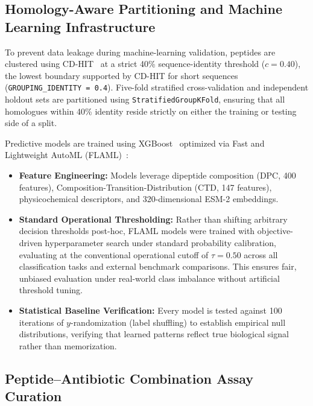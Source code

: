 \documentclass[unnumsec,webpdf,contemporary,large]{oup-authoring-template}%
\begin{document}
\subsection{Homology-Aware Partitioning and Machine Learning Infrastructure}

To prevent data leakage during machine-learning validation, peptides are clustered using CD-HIT~\cite{fu2012cdhit} at a strict 40\% sequence-identity threshold ($c = 0.40$), the lowest boundary supported by CD-HIT for short sequences (\texttt{GROUPING\_IDENTITY = 0.4}). Five-fold stratified cross-validation and independent holdout sets are partitioned using \texttt{StratifiedGroupKFold}, ensuring that all homologues within 40\% identity reside strictly on either the training or testing side of a split.

Predictive models are trained using XGBoost~\cite{chen2016xgboost} optimized via Fast and Lightweight AutoML (FLAML)~\cite{wang2021flaml}:
\begin{itemize}
    \item \textbf{Feature Engineering:} Models leverage dipeptide composition (DPC, 400 features), Composition-Transition-Distribution (CTD, 147 features), physicochemical descriptors, and 320-dimensional ESM-2 embeddings.
    \item \textbf{Standard Operational Thresholding:} Rather than shifting arbitrary decision thresholds post-hoc, FLAML models were trained with objective-driven hyperparameter search under standard probability calibration, evaluating at the conventional operational cutoff of $\tau = 0.50$ across all classification tasks and external benchmark comparisons. This ensures fair, unbiased evaluation under real-world class imbalance without artificial threshold tuning.
    \item \textbf{Statistical Baseline Verification:} Every model is tested against 100 iterations of $y$-randomization (label shuffling) to establish empirical null distributions, verifying that learned patterns reflect true biological signal rather than memorization.
\end{itemize}

\subsection{Peptide--Antibiotic Combination Assay Curation}
\end{document}
